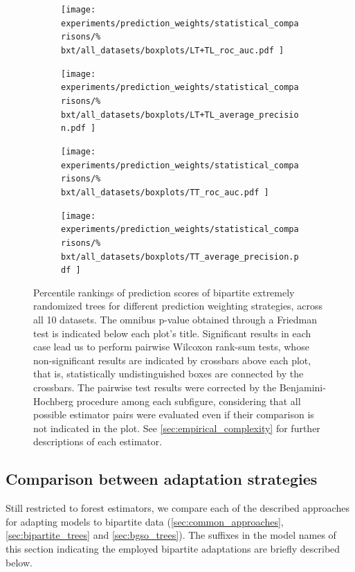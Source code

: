 \begin{figure}[tbh]
    \centering
    \begin{subfigure}{0.49\textwidth}
        \texttt{[image: 
            experiments/prediction\_weights/statistical\_comparisons/\%
            bxt/all\_datasets/boxplots/LT+TL\_roc\_auc.pdf
        ]}
    \end{subfigure}
    \begin{subfigure}{0.49\textwidth}
        \texttt{[image: 
            experiments/prediction\_weights/statistical\_comparisons/\%
            bxt/all\_datasets/boxplots/LT+TL\_average\_precision.pdf
        ]}
    \end{subfigure}

    \begin{subfigure}{0.49\textwidth}
        \texttt{[image: 
            experiments/prediction\_weights/statistical\_comparisons/\%
            bxt/all\_datasets/boxplots/TT\_roc\_auc.pdf
        ]}
    \end{subfigure}
    \begin{subfigure}{0.49\textwidth}
        \texttt{[image: 
            experiments/prediction\_weights/statistical\_comparisons/\%
            bxt/all\_datasets/boxplots/TT\_average\_precision.pdf
        ]}
    \end{subfigure}
    \caption{
        Percentile rankings of prediction scores of bipartite extremely randomized trees for different prediction weighting strategies, across all 10 datasets.
        The omnibus p-value obtained through a Friedman test is indicated below each plot's title. Significant results in each case lead us to perform pairwise Wilcoxon rank-sum tests, whose non-significant results are indicated by crossbars above each plot, that is, statistically undistinguished boxes are connected by the crossbars. The pairwise test results were corrected by the Benjamini-Hochberg procedure among each subfigure, considering that all possible estimator pairs were evaluated even if their comparison is not indicated in the plot. See \autoref{sec:empirical_complexity} for further descriptions of each estimator.
    }
    \label{fig:pred_weights_bxt}
\end{figure}


\subsection{Comparison between adaptation strategies}
\label{sec:adaptation_comparison}

Still restricted to forest estimators, we compare each of the described approaches for adapting models to bipartite data (\autoref{sec:common_approaches}, \autoref{sec:bipartite_trees} and \autoref{sec:bgso_trees}). The suffixes in the model names of this section indicating the employed bipartite adaptations are briefly described below.

